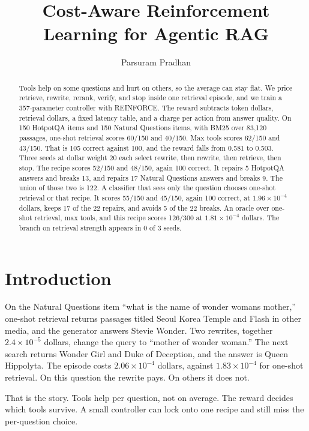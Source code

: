 \documentclass[letterpaper]{article} %
\title{Cost-Aware Reinforcement Learning for Agentic RAG}
\author{Parsuram Pradhan}
\begin{document}
\maketitle

\begin{abstract}
Tools help on some questions and hurt on others, so the average can stay flat. We price retrieve, rewrite, rerank, verify, and stop inside one retrieval episode, and we train a 357-parameter controller with REINFORCE. The reward subtracts token dollars, retrieval dollars, a fixed latency table, and a charge per action from answer quality. On 150 HotpotQA items and 150 Natural Questions items, with BM25 over 83{,}120 passages, one-shot retrieval scores 60/150 and 40/150. Max tools scores 62/150 and 43/150. That is 105 correct against 100, and the reward falls from 0.581 to 0.503. Three seeds at dollar weight 20 each select rewrite, then rewrite, then retrieve, then stop. The recipe scores 52/150 and 48/150, again 100 correct. It repairs 5 HotpotQA answers and breaks 13, and repairs 17 Natural Questions answers and breaks 9. The union of those two is 122. A classifier that sees only the question chooses one-shot retrieval or that recipe. It scores 55/150 and 45/150, again 100 correct, at \(1.96\times 10^{-4}\) dollars, keeps 17 of the 22 repairs, and avoids 5 of the 22 breaks. An oracle over one-shot retrieval, max tools, and this recipe scores 126/300 at \(1.81\times 10^{-4}\) dollars. The branch on retrieval strength appears in 0 of 3 seeds.
\end{abstract}

\section{Introduction}
On the Natural Questions item ``what is the name of wonder womans mother,'' one-shot retrieval returns passages titled Seoul Korea Temple and Flash in other media, and the generator answers Stevie Wonder. Two rewrites, together \(2.4\times 10^{-5}\) dollars, change the query to ``mother of wonder woman.'' The next search returns Wonder Girl and Duke of Deception, and the answer is Queen Hippolyta. The episode costs \(2.06\times 10^{-4}\) dollars, against \(1.83\times 10^{-4}\) for one-shot retrieval. On this question the rewrite pays. On others it does not.

That is the story. Tools help per question, not on average. The reward decides which tools survive. A small controller can lock onto one recipe and still miss the per-question choice.
\end{document}
